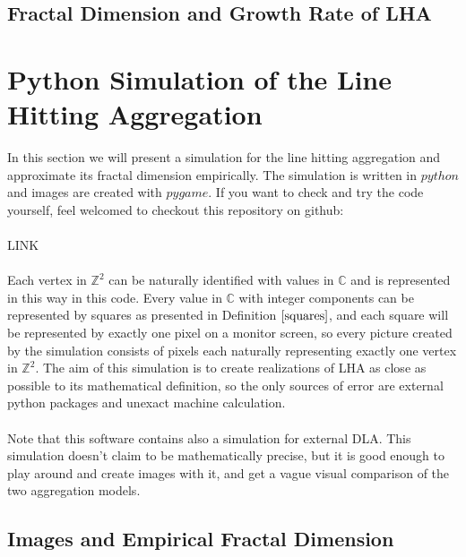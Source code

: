 \documentclass[12pt,a4paper]{scrartcl}
\numberwithin{equation}{subsection}
\newcommand{\C}{\mathbb{C}} %
\newcommand{\Z}{\mathbb{Z}} %
\newcommand{\1}{\mathbbm{1}}
\numberwithin{equation}{section}
\theoremstyle{definition}
\begin{document}
\subsection{Fractal Dimension and Growth Rate of LHA}




\newpage
\section{Python Simulation of the Line Hitting Aggregation}
In this section we will present a simulation for the line hitting aggregation and approximate its fractal dimension empirically. The simulation is written in $\mathit{python}$ and images are created with $\mathit{pygame}$. If you want to check and try the code yourself, feel welcomed to checkout this repository on github:\\
\\LINK \\
\\Each vertex in $\Z^2$ can be naturally identified with values in $\C$ and is represented in this way in this code. Every value in $\C$ with integer components can be represented by squares as presented in Definition $\ref{squares}$, and each square will be represented by exactly one pixel on a monitor screen, so every picture created by the simulation consists of pixels each naturally representing exactly one vertex in $\Z^2$. The aim of this simulation is to create realizations of LHA as close as possible to its mathematical definition, so the only sources of error are external python packages and unexact machine calculation. \\
\\Note that this software contains also a simulation for external DLA. This simulation doesn't claim to be mathematically precise, but it is good enough to play around and create images with it, and get a vague visual comparison of the two aggregation models. 

\subsection{Images and Empirical Fractal Dimension}
\end{document}
